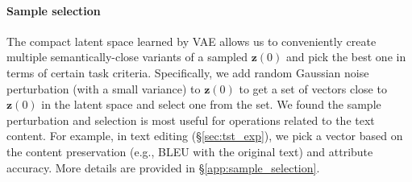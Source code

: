 \documentclass[11pt]{article}
\begin{document}
\paragraph{Sample selection}
The compact latent space learned by VAE allows us to conveniently create multiple semantically-close variants of a sampled $\bm{z}(0)$ and pick the best one in terms of certain task criteria. Specifically, we add random Gaussian noise perturbation (with a small variance) to $\bm{z}(0)$ to get a set of vectors close to $\bm{z}(0)$ in the latent space and select one from the set. We found the sample perturbation and selection is most useful for operations related to the text content. For example, in text editing (\S\ref{sec:tst_exp}), we pick a vector based on the content preservation (e.g., BLEU with the original text) and attribute accuracy. More details are provided in \S\ref{app:sample_selection}.









 
\end{document}
